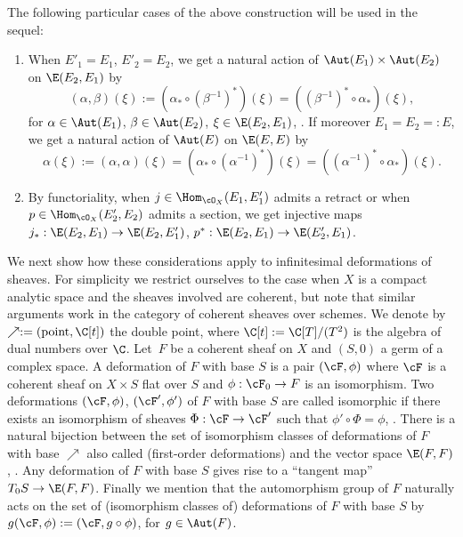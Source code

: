 \begin{rem}\label{remark:extensions}
The following particular cases of the above construction will be used in the sequel:
\begin{enumerate}
\item\label{remark:extensions1}
When $E'_1=E_1$, $E'_2=E_2$, we get a natural action of
$\Aut(E_1)\times\Aut(E_2)$ on $\E(E_2,E_1)$ by\vspace*{-4pt}
\[
(\alpha,\beta)(\xi):= (\alpha_*\circ(\beta^{-1})^*)(\xi)=((\beta^{-1})^*\circ\alpha_*)(\xi),
\]
for $\alpha\in \Aut(E_1)$, $\beta\in\Aut(E_2)$, $\xi\in\E(E_2,E_1)$, \cf \cite[Chap.\,7]{LePotier_Lectures}. If moreover $E_1=E_2=:E$, we get a natural action of $\Aut(E)$ on $\E(E,E)$ by\vspace*{-2pt}
\[
\alpha(\xi):=(\alpha,\alpha)(\xi)= (\alpha_*\circ(\alpha^{-1})^*)(\xi)=((\alpha^{-1})^*\circ\alpha_*)(\xi).
\]
\item\label{remark:extensions2}
By functoriality, when $j\in \Hom_{\cO_X}(E_1,E'_1)$ admits a retract or when
$p\in\Hom_{\cO_X}(E'_2,E_2)$ admits a section, we get injective maps $j_*:\E(E_2,E_1)\to\E(E_2,E'_1)$,
$p^*:\E(E_2,E_1)\to\E(E'_2,E_1)$.
\end{enumerate}
\end{rem}

We next show how these considerations apply to infinitesimal deformations of sheaves. For simplicity we restrict ourselves to the case when $X$ is a compact analytic space and the sheaves involved are coherent, but note that similar arguments work in the category of coherent sheaves over schemes. We denote by $\nearrow:=(\mathrm{point}, \C[t])$ the double point, where $\C[t]:=\C[T]/(T^2)$ is the algebra of dual numbers over $\C$. Let~$F$ be a coherent sheaf on $X$ and $(S,0)$ a germ of a complex space. A deformation of $F$ with base $S$ is a pair $(\cF,\phi)$ where $\cF$ is a coherent sheaf on $X\times S$ flat over $S$ and $\phi:\cF_0\to F$ is an isomorphism. Two deformations $(\cF,\phi)$, $(\cF',\phi')$ of $F$ with base $S$ are called isomorphic if there exists an isomorphism of sheaves $\Phi:\cF\to\cF'$ such that $\phi'\circ\Phi=\phi$,
\cite[\S 4.2.2]{Palamodov-versal}.
There is a natural bijection between the set of isomorphism classes of deformations of $F$ with base $\nearrow$ also called (first-order deformations) and the vector space $\E(F,F)$, \cite[Th.\,2.7]{Hartshorne_Deformations}.
Any deformation of $F$ with base $S$ gives rise to a ``tangent map'' $T_0S\to\E(F,F)$. Finally we mention that the automorphism group of $F$ naturally acts on the set of (isomorphism classes of) deformations of $F$ with base $S$ by $g(\cF,\phi):=(\cF,g\circ\phi)$, for $g\in\Aut(F)$.

